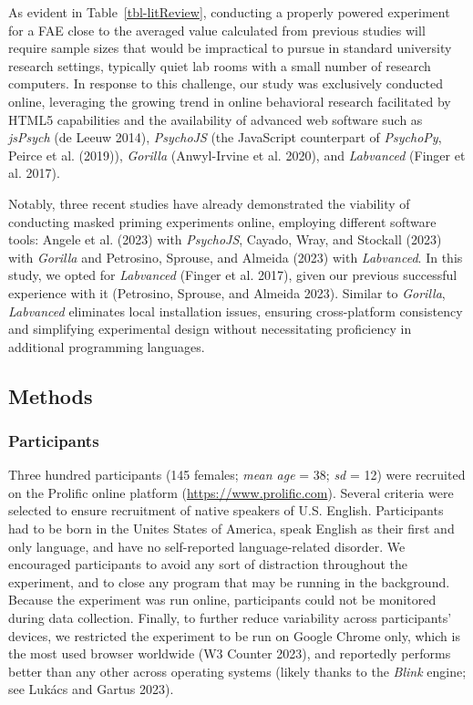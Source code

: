 \documentclass[
]{interact}
\begin{document}
As evident in Table~\ref{tbl-litReview}, conducting a properly powered
experiment for a FAE close to the averaged value calculated from
previous studies will require sample sizes that would be impractical to
pursue in standard university research settings, typically quiet lab
rooms with a small number of research computers. In response to this
challenge, our study was exclusively conducted online, leveraging the
growing trend in online behavioral research facilitated by HTML5
capabilities and the availability of advanced web software such as
\emph{jsPsych} (de Leeuw 2014), \emph{PsychoJS} (the JavaScript
counterpart of \emph{PsychoPy}, Peirce et al. (2019)), \emph{Gorilla}
(Anwyl-Irvine et al. 2020), and \emph{Labvanced} (Finger et al. 2017).

Notably, three recent studies have already demonstrated the viability of
conducting masked priming experiments online, employing different
software tools: Angele et al. (2023) with \emph{PsychoJS}, Cayado, Wray,
and Stockall (2023) with \emph{Gorilla} and Petrosino, Sprouse, and
Almeida (2023) with \emph{Labvanced}. In this study, we opted for
\emph{Labvanced} (Finger et al. 2017), given our previous successful
experience with it (Petrosino, Sprouse, and Almeida 2023). Similar to
\emph{Gorilla}, \emph{Labvanced} eliminates local installation issues,
ensuring cross-platform consistency and simplifying experimental design
without necessitating proficiency in additional programming languages.

\subsection{Methods}\label{sec-exp1-methods}

\subsubsection{Participants}\label{sec-exp1-methods-participants}

Three hundred participants (145 females; \emph{mean age} = 38; \emph{sd}
= 12) were recruited on the Prolific online platform
(\url{https://www.prolific.com}). Several criteria were selected to
ensure recruitment of native speakers of U.S. English. Participants had
to be born in the Unites States of America, speak English as their first
and only language, and have no self-reported language-related disorder.
We encouraged participants to avoid any sort of distraction throughout
the experiment, and to close any program that may be running in the
background. Because the experiment was run online, participants could
not be monitored during data collection. Finally, to further reduce
variability across participants' devices, we restricted the experiment
to be run on Google Chrome only, which is the most used browser
worldwide (W3 Counter 2023), and reportedly performs better than any
other across operating systems (likely thanks to the \emph{Blink}
engine; see Lukács and Gartus 2023).
\end{document}
